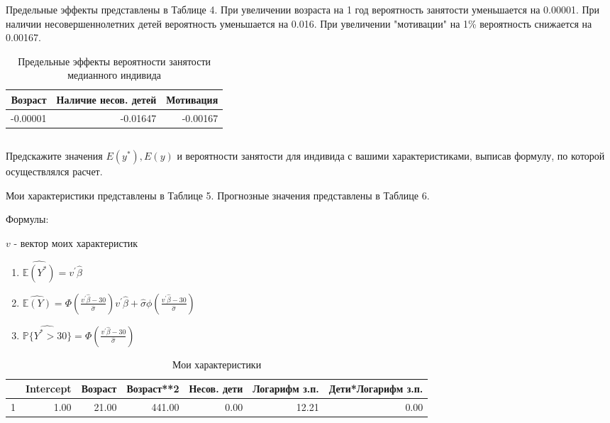 \documentclass[a4paper,12pt]{article}
\def \hb{\hat{\beta}}
\def \hb{\hat{\beta}}
\def \mbb{\mathbb}
\def \P{\mbb{P}}
\def \E{\mbb{E}}
\begin{document}
Предельные эффекты представлены в Таблице 4. При увеличении возраста на 1 год вероятность занятости уменьшается на 0.00001. При наличии несовершеннолетних детей вероятность уменьшается на 0.016. При увеличении "мотивации" на 1\% вероятность снижается на 0.00167.

\begin{table}[ht]
	\centering
	\begin{tabular}{|rrr|}
		\hline
		 Возраст & Наличие несов. детей & Мотивация \\ 
		\hline
	 -0.00001 & -0.01647 & -0.00167 \\ 
		\hline
	\end{tabular}
\caption{Предельные эффекты вероятности занятости медианного индивида}
\end{table}

\subsection{}
\Sun Предскажите значения
$E\left(y^{*}\right), E(y)$
и вероятности занятости для индивида с
вашими характеристиками, выписав формулу, по которой осуществлялся расчет.

Мои характеристики представлены в Таблице 5. Прогнозные значения представлены в Таблице 6.

Формулы:

$ v $ - вектор моих характеристик
\begin{enumerate}
	\item $ \hat{\E(Y^*)} = v^\prime \hb $
	
	\item $ \hat{\E(Y)} = \Phi\left( \frac{v^\prime \hb - 30}{\hat{\sigma}} \right) v^\prime \hb + \hat{\sigma} \phi\left( \frac{v^\prime \hb - 30}{\hat{\sigma}} \right) $
	
	\item $ \hat{\P\{Y^* > 30\}} = \Phi\left( \frac{v^\prime \hb - 30}{\hat{\sigma}} \right) $
\end{enumerate}
\begin{table}[ht]
	\centering
	\begin{tabular}{|rrrrrrr|}
		\hline
		& Intercept & Возраст & Возраст**2 & Несов. дети & Логарифм з.п. & Дети*Логарифм з.п. \\ 
		\hline
		1 & 1.00 & 21.00 & 441.00 & 0.00 & 12.21 & 0.00 \\ 
		\hline
	\end{tabular}
\caption{Мои характеристики}
\end{table}
\end{document}
